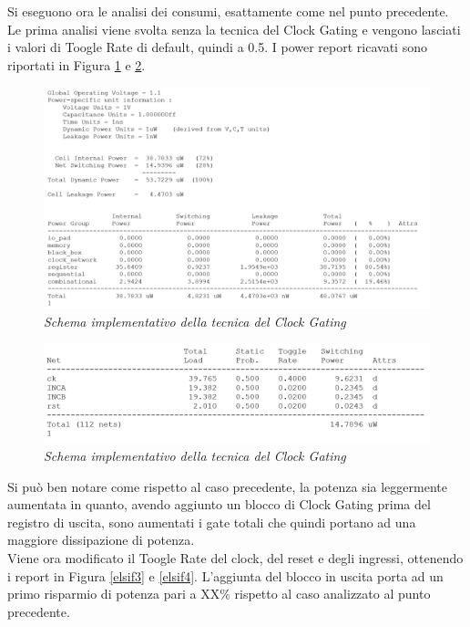 Si eseguono ora le analisi dei consumi, esattamente come nel punto precedente.\\
Le prima analisi viene svolta senza la tecnica del Clock Gating e vengono lasciati i valori di Toogle Rate di default, quindi a 0.5. I power report ricavati sono riportati in Figura \ref{elsif1} e \ref{elsif2}.
\begin{figure}[!htb]
	\centering
	\includegraphics[scale=0.65]{immagini/elsif1}
	\caption{\textit{Schema implementativo della tecnica del Clock Gating}}
	\label{elsif1}
\end{figure}
\begin{figure}[!htb]
	\centering
	\includegraphics[scale=0.65]{immagini/elsif2}
	\caption{\textit{Schema implementativo della tecnica del Clock Gating}}
	\label{elsif2}
\end{figure}
Si può ben notare come rispetto al caso precedente, la potenza sia leggermente aumentata in quanto, avendo aggiunto un blocco di Clock Gating prima del registro di uscita, sono aumentati i gate totali che quindi portano ad una maggiore dissipazione di potenza. \\
Viene ora modificato il Toogle Rate del clock, del reset e degli ingressi, ottenendo i report in Figura \ref{elsif3} e \ref{elsif4}. L'aggiunta del blocco in uscita porta ad un primo risparmio di potenza pari a XX\% rispetto al caso analizzato al punto precedente. \\
